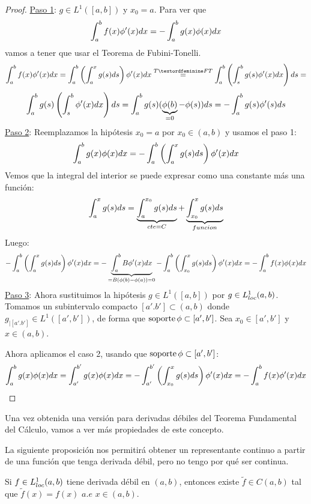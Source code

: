 \begin{proof}
\underline{Paso 1}: $g\in L^1([a,b])$ y $x_0=a$. Para ver que
\[
\displaystyle\int_{ a }^{ b } f(x)\phi'(x)dx=-\displaystyle\int_{ a }^{ b } g(x)\phi(x)dx 
\]
vamos a tener que usar el Teorema de Fubini-Tonelli.
\[
\integral{a}{b}{f(x)\phi'(x)dx}=
\integral{a}{b}{\left(\integral{a}{x}{g(s)ds}\right)\phi'(x)dx}\overset{TªFT}{=}
\integral{a}{b}{\left(\integral{s}{b}{g(s)\phi'(x)dx}\right)ds}=\]
\[
\displaystyle\int_{ a }^{ b } g(s)\left(\displaystyle\int_{ s }^{ b } \phi'(x)dx\right)ds
=\displaystyle\int_{ a }^{ b } g(s)(\underbrace{\phi(b)}_{=0}-\phi(s))ds=-\displaystyle\int_{ a }^{ b } g(s)\phi'(s)ds
\]
\underline{Paso 2}: Reemplazamos la hipótesis $x_0=a$ por $x_0\in(a,b)$ y usamos el paso 1:
\[
\displaystyle\int_{ a }^{ b } g(x)\phi(x)dx=-\displaystyle\int_{ a }^{ b } \left(\displaystyle\int_{ a }^{ x } g(s)ds\right)\phi'(x)dx
\]
Vemos que la integral del interior se puede expresar como una constante más una función:
\[
\displaystyle\int_{ a }^{ x } g(s)ds=\underbrace{\displaystyle\int_{ a }^{ x_0 } g(s)ds}_{cte=C}+\underbrace{\displaystyle\int_{ x_0 }^{ x } g(s)ds}_{funcion}
\]
Luego:
\[
-\displaystyle\int_{ a }^{ b } \left(\displaystyle\int_{ a }^{ x } g(s)ds\right)\phi'(x)dx=
-\underbrace{\displaystyle\int_{ a }^{ b } B\phi'(x)dx}_{=B(\phi(b)-\phi(a))=0}-\displaystyle\int_{ a }^{ b } \left(\displaystyle\int_{ x_0 }^{ x } g(s)ds\right)\phi'(x)dx=
-\displaystyle\int_{ a }^{ b } f(x)\phi(x)dx
\]
\underline{Paso 3}: Ahora sustituimos la hipótesis $g\in L^1([a,b])$ por $g\in L^1_{loc}(a,b)$. Tomamos un subintervalo compacto $[a'.b']\subset(a,b)$ donde $g_{|[a'.b']}\in L^1([a',b'])$, de forma que $\operatorname{soporte}\phi\subset[a',b']$. Sea $x_0\in[a',b']$ y $x\in(a,b)$.

Ahora aplicamos el caso 2, usando que $\operatorname{soporte}\phi\subset[a',b']$:
\[
\displaystyle\int_{ a }^{ b } g(x)\phi(x)dx=\displaystyle\int_{ a' }^{ b' } g(x)\phi(x)dx=-\displaystyle\int_{ a' }^{ b' } \left(\displaystyle\int_{ x_0 }^{ x } g(s)ds\right)\phi'(x)dx=-\displaystyle\int_{ a }^{ b } f(x)\phi'(x)dx
\]
\end{proof}

Una vez obtenida una versión para derivadas débiles del Teorema Fundamental del Cálculo, vamos a ver más propiedades de este concepto.

La siguiente proposición nos permitirá obtener un representante continuo a partir de una función que tenga derivada débil, pero no tengo por qué ser continua.

\begin{prop}
\label{representantecontinuo}
Si $f\in L^1_{loc}(a,b)$ tiene derivada débil en $(a,b)$, entonces existe $\tilde{f}\in C(a,b)$ tal que $\tilde{f}(x)=f(x)$ $a.e$ $x\in(a,b)$.
\end{prop}

